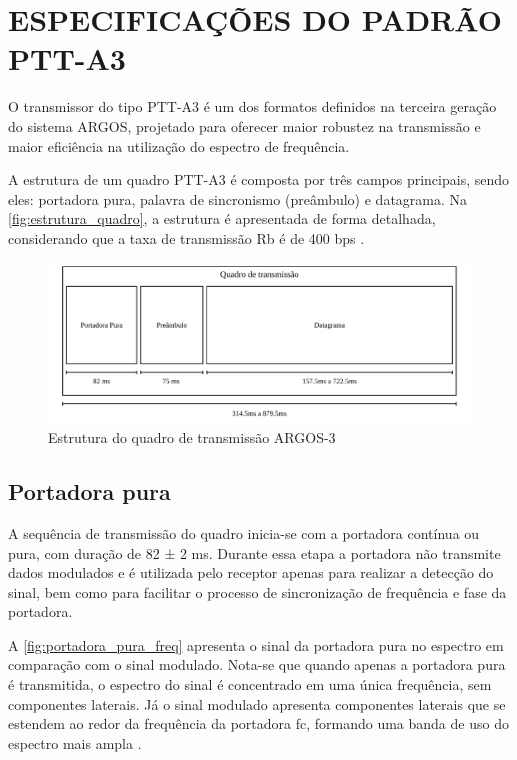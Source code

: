 \section{ESPECIFICAÇÕES DO PADRÃO PTT-A3}

O transmissor do tipo \gls{PTT-A3} é um dos formatos definidos na terceira geração do sistema \gls{ARGOS}, projetado para oferecer maior robustez na transmissão e maior eficiência na utilização do espectro de frequência. 

A estrutura de um quadro \gls{PTT-A3} é composta por três campos principais, sendo eles: portadora pura, palavra de sincronismo (preâmbulo) e datagrama. Na \autoref{fig:estrutura_quadro}, a estrutura é apresentada de forma detalhada, considerando que a taxa de transmissão \gls{Rb} é de 400 \gls{bps} \textcite{cnes_services_and_message_formats_ed2_rev2_2006}.

\begin{figure}[H]
	\centering
	\caption{Estrutura do quadro de transmissão ARGOS-3}\label{fig:estrutura_quadro}
	\includegraphics[width=\linewidth]{assets/quadro.pdf}
\end{figure}

\subsection{Portadora pura}

A sequência de transmissão do quadro inicia-se com a portadora contínua ou pura, com duração de 82 ± 2 ms. Durante essa etapa a portadora não transmite dados modulados e é utilizada pelo receptor apenas para realizar a detecção do sinal, bem como para facilitar o processo de sincronização de frequência e fase da portadora. 

A \autoref{fig:portadora_pura_freq} apresenta o sinal da portadora pura no espectro em comparação com o sinal modulado. Nota-se que quando apenas a portadora pura é transmitida, o espectro do sinal é concentrado em uma única frequência, sem componentes laterais. Já o sinal modulado apresenta componentes laterais que se estendem ao redor da frequência da portadora \gls{fc}, formando uma banda de uso do espectro mais ampla \cite{cnes_services_and_message_formats_ed2_rev2_2006}.


